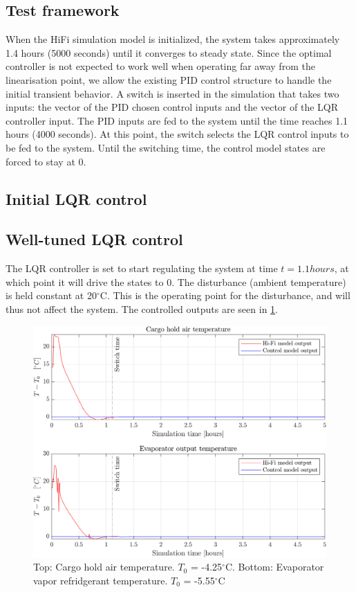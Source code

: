 \subsection{Test framework}
When the HiFi simulation model is initialized, the system takes approximately 1.4 hours (5000 seconds) until it converges to steady state. Since the optimal controller is not expected to work well when operating far away from the linearisation point, we allow the existing PID control structure to handle the initial transient behavior. 
A switch is inserted in the simulation that takes two inputs: the vector of the PID chosen control inputs and the vector of the LQR controller input. The PID inputs are fed to the system until the time reaches 1.1 hours (4000 seconds). At this point, the switch selects the LQR control inputs to be fed to the system. Until the switching time, the control model states are forced to stay at 0. \\

\subsection{Initial LQR control}



\subsection{Well-tuned LQR control}
The LQR controller is set to start regulating the system at time $t=1.1 hours$, at which point it will drive the states to 0. The disturbance (ambient temperature) is held constant at 20$^{\circ}$C. This is the operating point for the disturbance, and will thus not affect the system. The controlled outputs are seen in \cref{fig:LQR_wellTuned_noDist}.\\


\begin{figure}[h!]
	\centering
	\includegraphics[width=1\textwidth]{Graphics/fig_LQR_wellTuned_noDist.png}
	\caption{Top: Cargo hold air temperature. $T_0$ = -4.25$^{\circ}$C. Bottom: Evaporator vapor refridgerant temperature. $T_0$ = -5.55$^{\circ}$C}
	\label{fig:LQR_wellTuned_noDist}
\end{figure}

